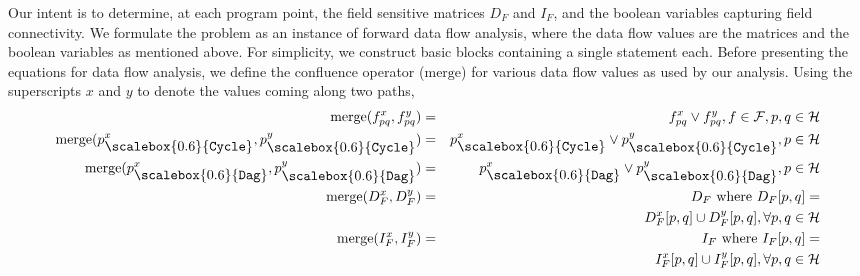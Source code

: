 \documentclass[letterpaper]{sig-alternate}
\newcommand{\p}{\ensuremath{p}}
\newcommand{\q}{\ensuremath{q}}
\newcommand{\heap}{\ensuremath{\mathcal{H}}}
\newcommand{\fields}{\ensuremath{\mathcal{F}}}
\newcommand{\nat}{\ensuremath{\mathcal{N}}}
\newcommand{\subC}{\mbox{\scalebox{0.6}{\Cycle}}}
\newcommand{\subD}{\mbox{\scalebox{0.6}{\Dag}}}
\newcommand{\merge}{\ensuremath{\mathrm{merge}}}
\newcommand{\Dag}{{\tt Dag}}
\newcommand{\Cycle}{{\tt Cycle}}
\newcommand{\sub}[2]{\ensuremath{{#1}_{#2}}}
\begin{document}
Our intent is to determine, at each program point, the field
sensitive matrices $\sub{D}{F}$ and $\sub{I}{F}$, and the
boolean variables capturing field connectivity. We formulate
the problem as an instance of forward data flow analysis,
where the data flow values are the matrices and the boolean
variables as mentioned above. For simplicity, we construct
basic blocks containing a single statement each. Before
presenting the equations for data flow analysis, we define
the confluence operator (\merge) for various data flow values
as used by our analysis. Using the superscripts $x$ and $y$
to denote the values coming along two paths,
\begin{eqnarray*}
  \merge( f_{\p\q}^x, f_{\p\q}^y ) &=& f_{\p\q}^x \vee f_{\p\q}^y, f \in \fields,
  \p,\q \in \heap \\
   \merge(\p_{\subC}^x, \p_{\subC}^y) &=& \p_{\subC}^x \vee
   \p_{\subC}^y, \p \in \heap \\
   \merge(\p_{\subD}^x, \p_{\subD}^y) &=& \p_{\subD}^x \vee
   \p_{\subD}^y, \p \in \heap \\
   \merge(\sub{D}{F}^{x}, \sub{D}{F}^{y}) &=& D_F \mbox{ where }
   D_F[{\p}, {\q}]  = \\ 
   && \sub{D}{F}^{x}[{\p}, {\q}] \cup
   \sub{D}{F}^{y}[{\p}, {\q}],   \forall {\p}, {\q} \in \heap\\ 
   \merge(\sub{I}{F}^{x}, \sub{I}{F}^{y}) &=& I_F \mbox{ where }
   I_F[{\p}, {\q}]  = \\
   && \sub{I}{F}^{x}[{\p}, {\q}] \cup
   \sub{I}{F}^{y}[{\p}, {\q}],  \forall {\p}, {\q} \in \heap
\end{eqnarray*}
\end{document}
